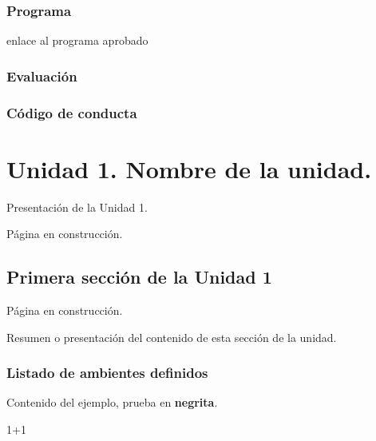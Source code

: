 \documentclass[
  letterpaper,
]{scrbook}
\newenvironment{Shaded}{\begin{snugshade}}{\end{snugshade}}
\newcommand{\DecValTok}[1]{\textcolor[rgb]{0.68,0.00,0.00}{#1}}
\newcommand{\SpecialCharTok}[1]{\textcolor[rgb]{0.37,0.37,0.37}{#1}}
\begin{document}

\section*{Programa}\label{programa}


enlace al programa aprobado

\section*{Evaluación}\label{evaluaciuxf3n}


\section*{Código de conducta}\label{cuxf3digo-de-conducta}


\part{Unidad 1. Nombre de la unidad.}

\thispagestyle{primerapagina}

Presentación de la Unidad 1.

Página en construcción.

\chapter{Primera sección de la Unidad
1}\label{primera-secciuxf3n-de-la-unidad-1}

\thispagestyle{primerapagina}

Página en construcción.

Resumen o presentación del contenido de esta sección de la unidad.

\section{Listado de ambientes
definidos}\label{listado-de-ambientes-definidos}

Contenido del ejemplo, prueba en \textbf{negrita}.

\begin{Shaded}
\begin{Highlighting}[]
\DecValTok{1}\SpecialCharTok{+}\DecValTok{1}
\end{Highlighting}
\end{Shaded}
\end{document}
